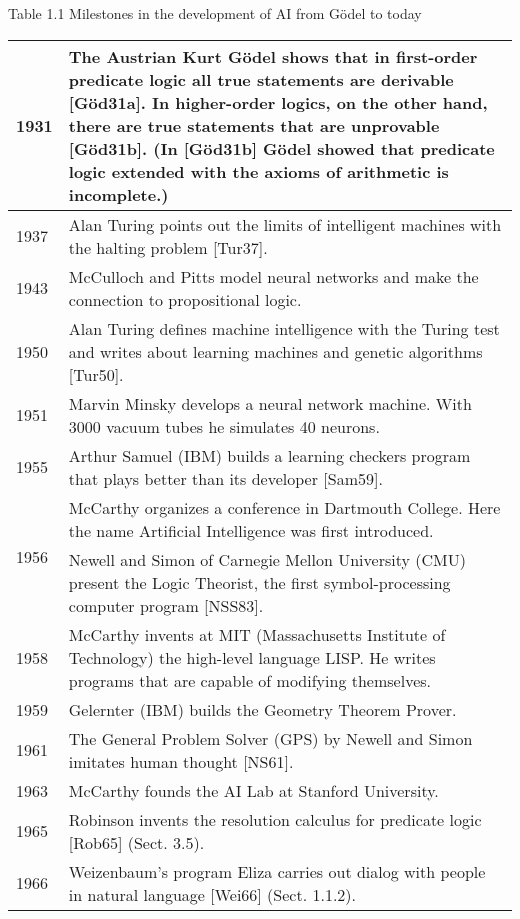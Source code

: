 \documentclass[10pt]{article}
\begin{document}
Table 1.1 Milestones in the development of AI from Gödel to today

\begin{center}
\begin{tabular}{|l|l|}
\hline
1931 & The Austrian Kurt Gödel shows that in first-order predicate logic all true statements are derivable [Göd31a]. In higher-order logics, on the other hand, there are true statements that are unprovable [Göd31b]. (In [Göd31b] Gödel showed that predicate logic extended with the axioms of arithmetic is incomplete.) \\
\hline
1937 & Alan Turing points out the limits of intelligent machines with the halting problem [Tur37]. \\
\hline
1943 & McCulloch and Pitts model neural networks and make the connection to propositional logic. \\
\hline
1950 & Alan Turing defines machine intelligence with the Turing test and writes about learning machines and genetic algorithms [Tur50]. \\
\hline
1951 & Marvin Minsky develops a neural network machine. With 3000 vacuum tubes he simulates 40 neurons. \\
\hline
1955 & Arthur Samuel (IBM) builds a learning checkers program that plays better than its developer [Sam59]. \\
\hline
\multirow[t]{2}{*}{1956} & McCarthy organizes a conference in Dartmouth College. Here the name Artificial Intelligence was first introduced. \\
\hline
 & Newell and Simon of Carnegie Mellon University (CMU) present the Logic Theorist, the first symbol-processing computer program [NSS83]. \\
\hline
1958 & McCarthy invents at MIT (Massachusetts Institute of Technology) the high-level language LISP. He writes programs that are capable of modifying themselves. \\
\hline
1959 & Gelernter (IBM) builds the Geometry Theorem Prover. \\
\hline
1961 & The General Problem Solver (GPS) by Newell and Simon imitates human thought [NS61]. \\
\hline
1963 & McCarthy founds the AI Lab at Stanford University. \\
\hline
1965 & Robinson invents the resolution calculus for predicate logic [Rob65] (Sect. 3.5). \\
\hline
1966 & Weizenbaum's program Eliza carries out dialog with people in natural language [Wei66] (Sect. 1.1.2). \\

\end{tabular}
\end{center}
\end{document}
